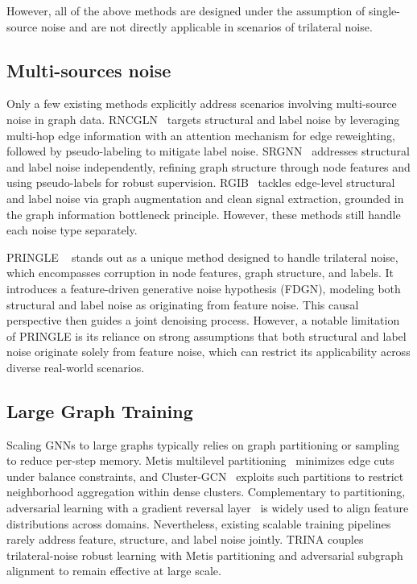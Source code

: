 \documentclass[sigconf, anonymous, review]{acmart}
\begin{document}
    However, all of the above methods are designed under the assumption of single-source noise and are not directly applicable in scenarios of trilateral noise.
    
  \subsection{Multi-sources noise}
    Only a few existing methods explicitly address scenarios involving multi-source noise in graph data.  RNCGLN~\cite{zhu2024robust} targets structural and label noise by leveraging multi-hop edge information with an attention mechanism for edge reweighting, followed by pseudo-labeling to mitigate label noise. SRGNN~\cite{yuan2023self} addresses structural and label noise independently, refining graph structure through node features and using pseudo-labels for robust supervision. RGIB~\cite{zhou2023combating} tackles edge-level structural and label noise via graph augmentation and clean signal extraction, grounded in the graph information bottleneck principle. 
    However, these methods still handle each noise type separately.

    PRINGLE ~\cite{in2024noise} stands out as a unique method designed to handle trilateral noise, which encompasses corruption in node features, graph structure, and labels. It introduces a feature-driven generative noise hypothesis (FDGN), modeling both structural and label noise as originating from feature noise. This causal perspective then guides a joint denoising process. However, a notable limitation of PRINGLE is its reliance on strong assumptions that both structural and label noise originate solely from feature noise, which can restrict its applicability across diverse real-world scenarios. 

  \subsection{Large Graph Training}
    Scaling GNNs to large graphs typically relies on graph partitioning or sampling to reduce per-step memory. Metis multilevel partitioning~\cite{karypis1998fast} minimizes edge cuts under balance constraints, and Cluster-GCN~\cite{chiang2019cluster} exploits such partitions to restrict neighborhood aggregation within dense clusters. Complementary to partitioning, adversarial learning with a gradient reversal layer~\cite{ganin2015unsupervised} is widely used to align feature distributions across domains. Nevertheless, existing scalable training pipelines rarely address feature, structure, and label noise jointly. TRINA couples trilateral-noise robust learning with Metis partitioning and adversarial subgraph alignment to remain effective at large scale.
\end{document}
